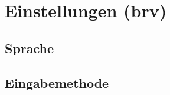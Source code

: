 \chapter{Einstellungen (brv)}
\label{chap:settings}

	\section{Sprache}
	\label{sec:lang}
	
	\section{Eingabemethode}
	\label{sec:input}